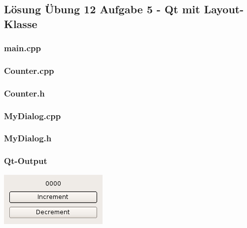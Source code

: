 \newpage
\subsection{Lösung Übung 12 Aufgabe 5 - Qt mit Layout-Klasse}
\subsubsection{main.cpp}

\subsubsection{Counter.cpp}

\subsubsection{Counter.h}

\subsubsection{MyDialog.cpp}

\subsubsection{MyDialog.h}

\subsubsection{Qt-Output}
\begin{center}
	\includegraphics[scale=.5]{./images/u12a5.png}
\end{center}

